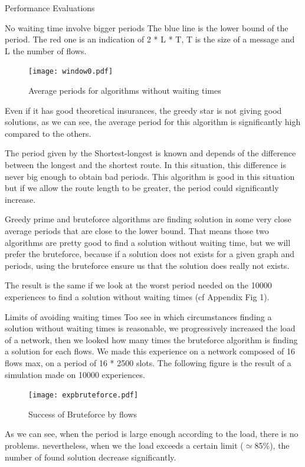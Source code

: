 \documentclass[a4paper,10pt]{report}
\begin{document}
\begin{chapter}{Performance Evaluations}
\begin{section}{No waiting time involve bigger periods}
The blue line is the lower bound of the period. The red one is an indication of 2 * L * T, T is the size of a message and L the number of flows.
\begin{figure}[H]
\hspace*{-3cm}
\centering
\texttt{[image: window0.pdf]}%
\caption{Average periods for algorithms without waiting times}
\end{figure}


Even if it has good theoretical insurances, the greedy star is not giving good solutions, as we can see, the average period for this algorithm is 
significantly high compared to the others.

The period given by the Shortest-longest is known and depends of the difference between the longest and the shortest route.
In this situation, this difference is never big enough to obtain bad periods. This algorithm is good in this situation but if we allow the 
route length to be greater, the period could significantly increase.

Greedy prime and bruteforce algorithms are finding solution in some very close average periods that are close to the lower bound.
That means those two algorithms are pretty good to find a solution without waiting time, but we will prefer the bruteforce,
because if a solution does not exists for a given graph and periods, using the bruteforce ensure us that the solution does really not exists.

The result is the same if we look at the worst period needed on the 10000 experiences to find a solution without waiting times (cf Appendix Fig 1).
\end{section}

\begin{section}{Limits of avoiding waiting times}
Too see in which circumstances finding a solution without waiting times is reasonable, we progressively increased the load of a network,
then we looked how many times the bruteforce algorithm is finding a solution for each flows.
We made this experience on a network composed of 16 flows max, on a period of 16 * 2500 slots.
The following figure is the result of a simulation made on 10000 experiences.

\begin{figure}[H]
\hspace*{-3cm}
\centering
\texttt{[image: expbruteforce.pdf]}%
\caption{Success of Bruteforce by flows}
\end{figure}
As we can see, when the period is large enough according to the load, there is no problems. nevertheless, when we the load exceeds a certain limit 
($\simeq$85\%), the number of found solution decrease significantly.


\end{section}
\end{chapter}
\end{document}

